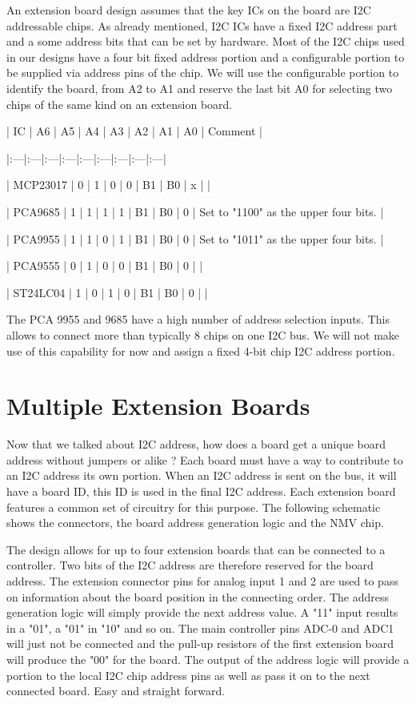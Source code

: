 An extension board design assumes that the key ICs on the board are I2C addressable chips. As already mentioned, I2C ICs have a fixed I2C address part and a some address bits that can be set by hardware. Most of the I2C chips used in our designs have a four bit fixed address portion and a configurable portion to be supplied via address pins of the chip. We will use the configurable portion to identify the board, from A2 to A1 and reserve the last bit A0 for selecting two chips of the same kind on an extension board.

| IC | A6 | A5 | A4 | A3 | A2 | A1 | A0 | Comment |

|:---|:---|:---|:---|:---|:---|:---|:---|:---|

| MCP23017 | 0 | 1 | 0 | 0 | B1 | B0 | x | |

| PCA9685  | 1 | 1 | 1 | 1 | B1 | B0 | 0 | Set to "1100" as the upper four bits. |

| PCA9955  | 1 | 1 | 0 | 1 | B1 | B0 | 0 | Set to "1011" as the upper four bits. |

| PCA9555  | 0 | 1 | 0 | 0 | B1 | B0 | 0 | |

| ST24LC04 | 1 | 0 | 1 | 0 | B1 | B0 | 0 | |

The PCA 9955 and 9685 have a high number of address selection inputs. This allows to connect more than typically 8 chips on one I2C bus. We will not make use of this capability for now and assign a fixed 4-bit chip I2C address portion.

\section{Multiple Extension Boards}

Now that we talked about I2C address, how does a board get a unique board address without jumpers or alike ? Each board must have a way to contribute to an I2C address its own portion. When an I2C address is sent on the bus, it will have a board ID, this ID is used in the final I2C address. Each extension board features a common set of circuitry for this purpose. The following schematic shows the connectors, the board address generation logic and the NMV chip.


The design allows for up to four extension boards that can be connected to a controller. Two bits of the I2C address are therefore reserved for the board address. The extension connector pins for analog input 1 and 2 are used to pass on information about the board position in the connecting order. The address generation logic will simply provide the next address value. A "11" input results in a "01", a "01" in "10" and so on. The main controller pins ADC-0 and ADC1 will just not be connected and the pull-up resistors of the first extension board will produce the "00" for the board. The output of the address logic will provide a portion to the  local I2C chip address pins as well as pass it on to the next connected board. Easy and straight forward.

